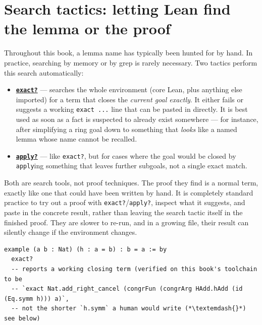 \section{Search tactics: letting Lean find the lemma or the proof}\label{sec:12-working-efficiently:01-search-tactics:1}

Throughout this book, a lemma name has typically been hunted for by hand. In practice, searching by memory or by grep is rarely necessary. Two tactics perform this search automatically:

\begin{itemize}
\tightlist
\item
  \textbf{\href{https://lean-lang.org/doc/reference/latest/Tactic-Proofs/Tactic-Reference/}{\texttt{exact?}}} --- searches the whole environment (core Lean, plus anything else imported) for a term that closes the \emph{current goal exactly}. It either fails or suggests a working \texttt{exact ...} line that can be pasted in directly. It is best used as soon as a fact is suspected to already exist somewhere --- for instance, after simplifying a ring goal down to something that \emph{looks} like a named lemma whose name cannot be recalled.
\item
  \textbf{\href{https://lean-lang.org/doc/reference/latest/Tactic-Proofs/Tactic-Reference/}{\texttt{apply?}}} --- like \texttt{exact?}, but for cases where the goal would be closed by \texttt{apply}ing something that leaves further subgoals, not a single exact match.
\end{itemize}

Both are search tools, not proof techniques. The proof they find is a normal term, exactly like one that could have been written by hand. It is completely standard practice to try out a proof with \texttt{exact?}/\texttt{apply?}, inspect what it suggests, and paste in the concrete result, rather than leaving the search tactic itself in the finished proof. They are slower to re-run, and in a growing file, their result can silently change if the environment changes.

\begin{lstlisting}
example (a b : Nat) (h : a = b) : b = a := by
  exact?
  -- reports a working closing term (verified on this book's toolchain to be
  -- `exact Nat.add_right_cancel (congrFun (congrArg HAdd.hAdd (id (Eq.symm h))) a)`,
  -- not the shorter `h.symm` a human would write (*\textemdash{}*) see below)
\end{lstlisting}

